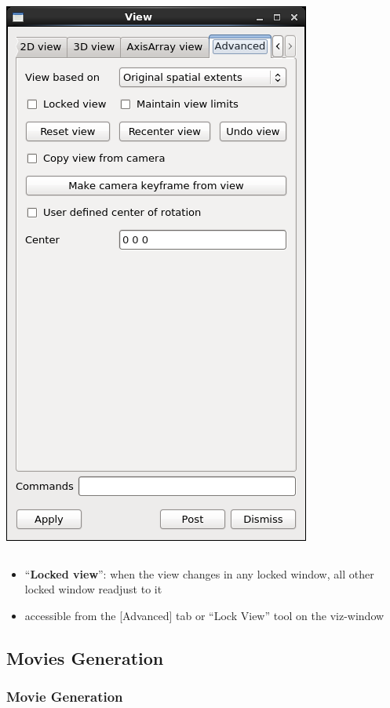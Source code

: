 \begin{frame}
\begin{columns}[T]
\begin{column}{3cm}
	\includegraphics[width=.9\columnwidth]{figs/visit-guis/visit_viewAdv}
\end{column}
\end{columns}

\begin{itemize}
	\item ``\textbf{Locked view}'': when the view changes in any locked window, all other locked window readjust to it
	\item accessible from the [Advanced] tab or ``Lock View'' tool on the viz-window
\end{itemize}

\end{frame}



\subsection{Movies Generation}

\begin{frame}
\frametitle{Movie Generation}

\end{frame}
